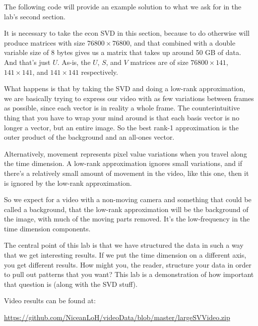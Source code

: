 The following code will provide an example solution to what we ask for in the lab's second section.


It is necessary to take the econ SVD in this section, because to do otherwise will produce matrices with size $76800 \times 76800$, and that combined with a double variable size of 8 bytes gives us a matrix that takes up around 50 GB of data. And that's just $U$. As-is, the $U$, $S$, and $V$ matrices are of size $76800\times 141$, $141 \times 141$, and $141 \times 141$ respectively. 

What happens is that by taking the SVD and doing a low-rank approximation, we are basically trying to express our video with as few variations between frames as possible, since each vector is in reality a whole frame. The counterintuitive thing that you have to wrap your mind around is that each basis vector is no longer a vector, but an entire image. So the best rank-1 approximation is the outer product of the background and an all-ones vector.

Alternatively, movement represents pixel value variations when you travel along the time dimension. A low-rank approximation ignores small variations, and if there's a relatively small amount of movement in the video, like this one, then it is ignored by the low-rank approximation.

So we expect for a video with a non-moving camera and something that could be called a background, that the low-rank approximation will be the background of the image, with much of the moving parts removed. It's the low-frequency in the time dimension components.

The central point of this lab is that we have structured the data in such a way that we get interesting results. If we put the time dimension on a different axis, you get different results. How might you, the reader, structure your data in order to pull out patterns that you want? This lab is a demonstration of how important that question is (along with the SVD stuff).

Video results can be found at:

\url{https://github.com/NiceanLoH/videoData/blob/master/largeSVVideo.zip}